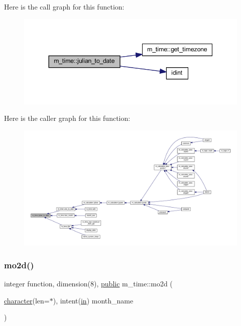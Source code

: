 \begin{DoxyVerb}
Here is the call graph for this function\+:
\nopagebreak
\begin{figure}[H]
\begin{center}
\leavevmode
\includegraphics[width=344pt]{namespacem__time_abb44cf18cd0a3e420c20469efb056203_cgraph}
\end{center}
\end{figure}
Here is the caller graph for this function\+:
\nopagebreak
\begin{figure}[H]
\begin{center}
\leavevmode
\includegraphics[width=350pt]{namespacem__time_abb44cf18cd0a3e420c20469efb056203_icgraph}
\end{center}
\end{figure}
\mbox{\label{namespacem__time_aa5877b420e38077f159482f214b2dc47}} 
\subsubsection{\texorpdfstring{mo2d()}{mo2d()}}
{\footnotesize\ttfamily integer function, dimension(8), \hyperlink{M__stopwatch_83_8txt_a2f74811300c361e53b430611a7d1769f}{public} m\+\_\+time\+::mo2d (\begin{DoxyParamCaption}\item[{\hyperlink{option__stopwatch_83_8txt_abd4b21fbbd175834027b5224bfe97e66}{character}(len=$\ast$), intent(\hyperlink{M__journal_83_8txt_afce72651d1eed785a2132bee863b2f38}{in})}]{month\+\_\+name }\end{DoxyParamCaption})}




\end{DoxyVerb}
